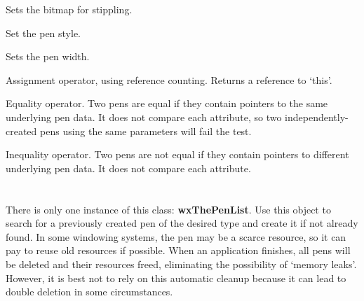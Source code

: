 
Sets the bitmap for stippling.



\label{wxpensetstyle}


Set the pen style.



\label{wxpensetwidth}


Sets the pen width.



\label{wxpenassignment}


Assignment operator, using reference counting. Returns a reference
to `this'.

\label{wxpenequals}


Equality operator. Two pens are equal if they contain pointers
to the same underlying pen data. It does not compare each attribute,
so two independently-created pens using the same parameters will
fail the test.

\label{wxpennotequals}


Inequality operator. Two pens are not equal if they contain pointers
to different underlying pen data. It does not compare each attribute.

\section{}\label{wxpenlist}

There is only one instance of this class: {\bf wxThePenList}.  Use
this object to search for a previously created pen of the desired
type and create it if not already found. In some windowing systems,
the pen may be a scarce resource, so it can pay to reuse old
resources if possible. When an application finishes, all pens will
be deleted and their resources freed, eliminating the possibility of
`memory leaks'. However, it is best not to rely on this automatic
cleanup because it can lead to double deletion in some circumstances.

